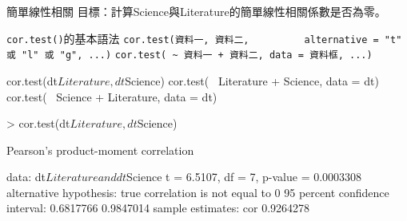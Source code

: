 \documentclass[14pt, aspectratio=43]{beamer}
\begin{document}
\begin{frame}{簡單線性相關}
目標：計算Science與Literature的簡單線性相關係數是否為零。
\begin{block}{\texttt{cor.test()}的基本語法}
\verb+cor.test(資料一, 資料二,+
\verb+         alternative = "t" 或 "l" 或 "g", ...)+
\verb#cor.test( ~ 資料一 + 資料二, data = 資料框, ...)#
\end{block}
\begin{RC}
cor.test(dt$Literature, dt$Science)
cor.test(~ Literature + Science, data = dt)
cor.test(~ Science + Literature, data = dt)
\end{RC}

\framebreak

\begin{RC}
> cor.test(dt$Literature, dt$Science)
\end{RC}
\begin{R}
	Pearson's product-moment correlation

data:  dt$Literature and dt$Science
t = 6.5107, df = 7, p-value = 0.0003308
alternative hypothesis: true correlation is not equal to 0
95 percent confidence interval:
 0.6817766 0.9847014
sample estimates:
      cor 
0.9264278
\end{R}
\end{frame}
\end{document}
